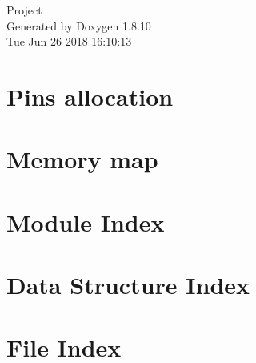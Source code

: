 \documentclass[twoside]{book}
\newcommand{\+}{\discretionary{\mbox{\scriptsize$\hookleftarrow$}}{}{}}
\newcommand{\clearemptydoublepage}{%
  \newpage{\pagestyle{empty}\cleardoublepage}%
}
\begin{document}
\hypersetup{pageanchor=false,
             bookmarks=true,
             bookmarksnumbered=true,
             pdfencoding=unicode
            }
\begin{titlepage}
\vspace*{7cm}
\begin{center}%
{\Large Project }\\
\vspace*{1cm}
{\large Generated by Doxygen 1.8.10}\\
\vspace*{0.5cm}
{\small Tue Jun 26 2018 16:10:13}\\
\end{center}
\end{titlepage}
\clearemptydoublepage
\tableofcontents
\clearemptydoublepage
{}
\hypersetup{pageanchor=true}

\chapter{Pins allocation}
\label{page_pinalloc}
\hypertarget{page_pinalloc}{}

\chapter{Memory map}
\label{page_memorymap}
\hypertarget{page_memorymap}{}

\chapter{Module Index}

\chapter{Data Structure Index}

\chapter{File Index}

\end{document}
